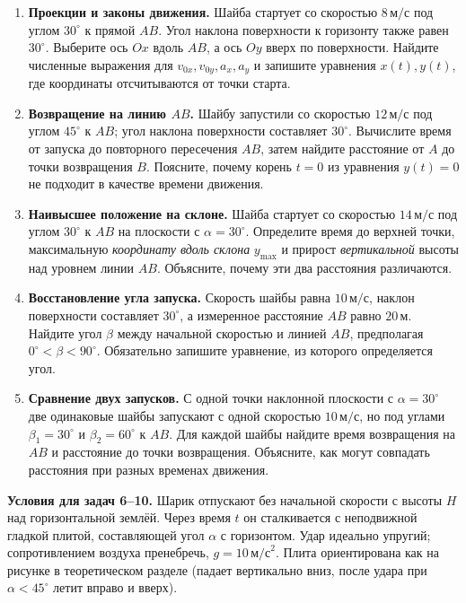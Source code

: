 \documentclass[a4paper,12pt]{article}
\begin{document}
\begin{enumerate}[label=\textbf{\arabic*.},itemsep=10pt]
\item \textbf{Проекции и законы движения.} Шайба стартует со скоростью \(8\,\text{м/с}\) под углом \(30^\circ\) к прямой \(AB\). Угол наклона поверхности к горизонту также равен \(30^\circ\). Выберите ось \(Ox\) вдоль \(AB\), а ось \(Oy\) вверх по поверхности. Найдите численные выражения для \(v_{0x},v_{0y},a_x,a_y\) и запишите уравнения \(x(t),y(t)\), где координаты отсчитываются от точки старта.
\item \textbf{Возвращение на линию \(AB\).} Шайбу запустили со скоростью \(12\,\text{м/с}\) под углом \(45^\circ\) к \(AB\); угол наклона поверхности составляет \(30^\circ\). Вычислите время от запуска до повторного пересечения \(AB\), затем найдите расстояние от \(A\) до точки возвращения \(B\). Поясните, почему корень \(t=0\) из уравнения \(y(t)=0\) не подходит в качестве времени движения.
\item \textbf{Наивысшее положение на склоне.} Шайба стартует со скоростью \(14\,\text{м/с}\) под углом \(30^\circ\) к \(AB\) на плоскости с \(\alpha=30^\circ\). Определите время до верхней точки, максимальную \emph{координату вдоль склона} \(y_{\max}\) и прирост \emph{вертикальной} высоты над уровнем линии \(AB\). Объясните, почему эти два расстояния различаются.
\item \textbf{Восстановление угла запуска.} Скорость шайбы равна \(10\,\text{м/с}\), наклон поверхности составляет \(30^\circ\), а измеренное расстояние \(AB\) равно \(20\,\text{м}\). Найдите угол \(\beta\) между начальной скоростью и линией \(AB\), предполагая \(0^\circ<\beta<90^\circ\). Обязательно запишите уравнение, из которого определяется угол.
\item \textbf{Сравнение двух запусков.} С одной точки наклонной плоскости с \(\alpha=30^\circ\) две одинаковые шайбы запускают с одной скоростью \(10\,\text{м/с}\), но под углами \(\beta_1=30^\circ\) и \(\beta_2=60^\circ\) к \(AB\). Для каждой шайбы найдите время возвращения на \(AB\) и расстояние до точки возвращения. Объясните, как могут совпадать расстояния при разных временах движения.
\end{enumerate}

\clearpage
\textbf{Условия для задач 6--10.} Шарик отпускают без начальной скорости с высоты \(H\) над горизонтальной землёй. Через время \(t\) он сталкивается с неподвижной гладкой плитой, составляющей угол \(\alpha\) с горизонтом. Удар идеально упругий; сопротивлением воздуха пренебречь, \(g=10\,\text{м/с}^2\). Плита ориентирована как на рисунке в теоретическом разделе (падает вертикально вниз, после удара при \(\alpha<45^\circ\) летит вправо и вверх).
\end{document}

